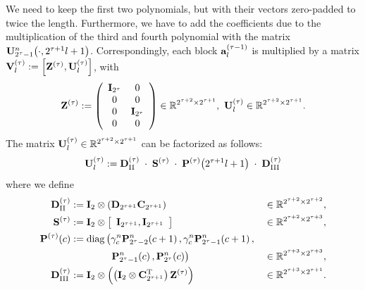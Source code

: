We need to keep the first two polynomials, but with their vectors zero-padded to twice the length. Furthermore, we have to add the coefficients due to the multiplication of the third and fourth polynomial with the matrix $\mathbf{U}_{2^{\tau}-1}^{n}{\hspace{-0.4ex}}\left(\cdot,2^{\tau+1}l+1\right)$.
Correspondingly, each block $\mathbf{a}_{l}^{(\tau-1)}$ is multiplied by a matrix $\mathbf{V}^{(\tau)}_l := \left[\mathbf{Z^{(\tau)}},\mathbf{U}^{(\tau)}_l\right]$, with
\[\V{Z}^{(\tau)} := \left(\begin{array}{cccc} \V{I}_{2^{\tau}} & 0\\ 0 & 0 \\ 0 & \V{I}_{2^{\tau}} \\ 0 & 0 \end{array}\right) \in \R^{2^{\tau+2} \times 2^{\tau+1}},\ \V{U}^{(\tau)}_l \in \R^{2^{\tau+2} \times 2^{\tau+1}}.\]
The matrix $\mathbf{U}^{(\tau)}_l \in \mathbb{R}^{2^{\tau+2} \times 2^{\tau+1}}$ can be factorized as follows:
\begin{equation} 
  \label{NFSFT:LinearAlgebra:Factorization}
  \mathbf{U}^{(\tau)}_l := \mathbf{D}^{(\tau)}_{\text{II}} \; \cdot \; \mathbf{S}^{(\tau)} \; \cdot \; \mathbf{P}^{(\tau)}{\hspace{-0.4ex}}\left(2^{\tau + 1}l+1\right) \; \cdot \; \mathbf{D}^{(\tau)}_{\text{III}}
\end{equation}
where we define
\begin{align*}
  \mathbf{D}^{(\tau)}_{\text{II}} & := \mathbf{I}_{2} \otimes \left(\mathbf{D}_{2^{\tau+1}} \mathbf{C}_{2^{\tau+1}}\right) & \in \mathbb{R}^{2^{\tau+2} \times 2^{\tau+2}},\\
  \mathbf{S}^{(\tau)} & := \mathbf{I}_2 \otimes \left[\begin{array}{cc}\mathbf{I}_{2^{\tau+1}},\mathbf{I}_{2^{\tau+1}}\end{array}\right] & \in \mathbb{R}^{2^{\tau+2} \times 2^{\tau+3}},\\
  \mathbf{P}^{(\tau)}{\hspace{-0.4ex}}\left(c\right) & := \text{diag}\left(\gamma_{c}^n \mathbf{P}_{2^{\tau}-2}^n{\hspace{-0.4ex}}\left(c+1\right),\gamma_{c}^n \mathbf{P}_{2^{\tau}-1}^n{\hspace{-0.4ex}}\left(c+1\right),\right.\\
    & \left. \hspace{9ex} \mathbf{P}_{2^{\tau}-1}^n{\hspace{-0.4ex}}\left(c\right), \mathbf{P}_{2^{\tau}}^n{\hspace{-0.4ex}}\left(c\right)\right) & \in \mathbb{R}^{2^{\tau+3} \times 2^{\tau+3}},\\
  \mathbf{D}^{(\tau)}_{\text{III}} & := \mathbf{I}_{2} \otimes \left(\left(\mathbf{I}_{2} \otimes \mathbf{C}^{\text{\rm{T}}}_{2^{\tau+1}}\right)\mathbf{Z}^{(\tau)}\right) & \in \mathbb{R}^{2^{\tau+3} \times 2^{\tau+1}}.
\end{align*}   

